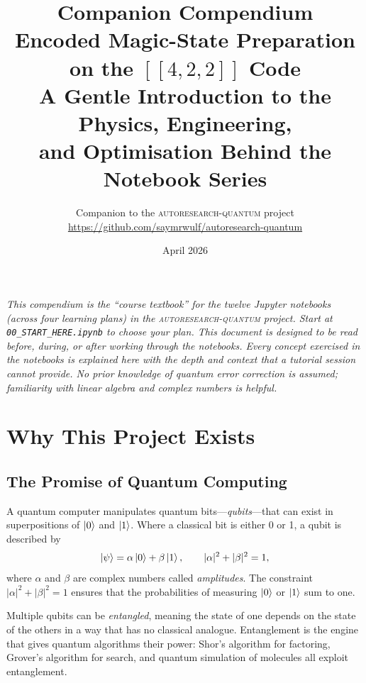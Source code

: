 \documentclass[11pt,a4paper,twoside]{report}
\title{%
  \vspace{-1cm}
  {\LARGE\bfseries Companion Compendium}\\[0.6em]
  {\Large Encoded Magic-State Preparation\\
  on the $[\![4,2,2]\!]$ Code}\\[1em]
  {\large A Gentle Introduction to the Physics, Engineering,\\
  and Optimisation Behind the Notebook Series}
}
\author{%
  Companion to the \textsc{autoresearch-quantum} project\\[0.3em]
  {\small\url{https://github.com/saymrwulf/autoresearch-quantum}}
}
\date{April 2026}
\theoremstyle{definition}
\begin{document}
\maketitle
\thispagestyle{empty}

\vfill
\begin{center}
\begin{minipage}{0.85\textwidth}
\small\itshape
This compendium is the ``course textbook'' for the twelve Jupyter notebooks
(across four learning plans) in the \textsc{autoresearch-quantum} project.
Start at \texttt{00\_START\_HERE.ipynb} to choose your plan. This document
is designed to be read before, during, or after working through the
notebooks. Every concept exercised in the notebooks is explained here
with the depth and context that a tutorial session cannot provide. No
prior knowledge of quantum error correction is assumed; familiarity with
linear algebra and complex numbers is helpful.
\end{minipage}
\end{center}
\vspace{2cm}

\tableofcontents

\chapter{Why This Project Exists}
\label{ch:motivation}

\section{The Promise of Quantum Computing}

A quantum computer manipulates quantum bits---\emph{qubits}---that can
exist in superpositions of $\ket{0}$ and $\ket{1}$. Where a classical
bit is either 0 or 1, a qubit is described by
\begin{equation}
  \ket{\psi} = \alpha\ket{0} + \beta\ket{1},
  \qquad |\alpha|^2 + |\beta|^2 = 1,
\end{equation}
where $\alpha$ and $\beta$ are complex numbers called \emph{amplitudes}.
The constraint $|\alpha|^2 + |\beta|^2 = 1$ ensures that the
probabilities of measuring $\ket{0}$ or $\ket{1}$ sum to one.

Multiple qubits can be \emph{entangled}, meaning the state of one
depends on the state of the others in a way that has no classical
analogue. Entanglement is the engine that gives quantum algorithms their
power: Shor's algorithm for factoring, Grover's algorithm for search,
and quantum simulation of molecules all exploit entanglement.
\end{document}
